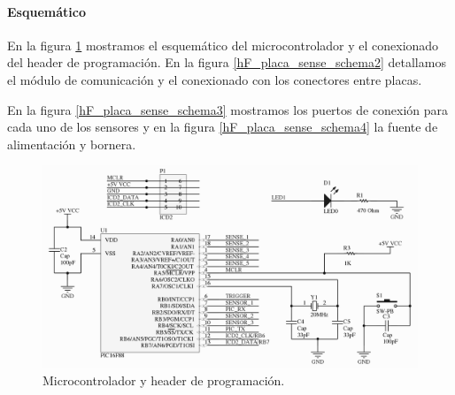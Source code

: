 \paragraph{Esquem\'atico}
\label{h_placas_sensado_esquematico}

En la figura \ref{hF_placa_sense_schema} mostramos el esquem\'atico del microcontrolador y el conexionado
del header de programaci\'on.
En la figura \ref{hF_placa_sense_schema2} detallamos el m\'odulo de comunicaci\'on y el conexionado con
los conectores entre placas.

En la figura \ref{hF_placa_sense_schema3} mostramos los puertos de conexi\'on para cada uno de los sensores
y en la figura \ref{hF_placa_sense_schema4} la fuente de alimentaci\'on y bornera.

\begin{figure}
	\centering
	\includegraphics[scale=.22]{figuras/sense_schemaMicro.png}
	\caption{Microcontrolador y header de programaci\'on.}
	\label{hF_placa_sense_schema}
\end{figure}

